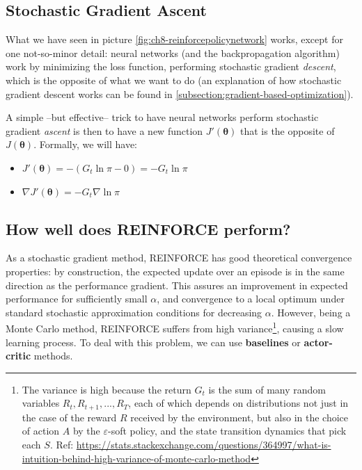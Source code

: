 \subsection{Stochastic Gradient Ascent}
What we have seen in picture \ref{fig:ch8-reinforcepolicynetwork} works, except for one not-so-minor detail: neural networks (and the backpropagation algorithm) work by minimizing the loss function, performing stochastic gradient \textit{descent}, which is the opposite of what we want to do (an explanation of how stochastic gradient descent works can be found in \autoref{subsection:gradient-based-optimization}).

A simple --but effective-- trick to have neural networks perform stochastic gradient \textit{ascent} is then to have a new function $J' (\boldsymbol{\theta})$ that is the opposite of $J(\boldsymbol{\theta})$. Formally, we will have:

\begin{itemize}
    \item $J' (\boldsymbol{\theta}) = -(G_t \ln{\pi} - 0) = -G_t \ln{\pi}$
    \item $\nabla J' (\boldsymbol{\theta}) = -G_t \nabla \ln{\pi}$
\end{itemize}

\subsection{How well does REINFORCE perform?}
As a stochastic gradient method, REINFORCE has good theoretical convergence properties: by construction, the expected update over an episode is in the same direction as the performance gradient. This assures an improvement in expected performance for sufficiently small $\alpha$, and convergence to a local optimum under standard stochastic approximation conditions for decreasing $\alpha$. However, being a Monte Carlo method, REINFORCE suffers from high variance\footnote{The variance is high because the return $G_t$ is the sum of many random variables $R_t, R_{t+1},...,R_T$, each of which depends on distributions not just in the case of the reward $R$ received by the environment, but also in the choice of action $A$ by the $\varepsilon$-soft policy, and the state transition dynamics that pick each $S$. Ref: \url{https://stats.stackexchange.com/questions/364997/what-is-intuition-behind-high-variance-of-monte-carlo-method}}, causing a slow learning process. To deal with this problem, we can use \textbf{baselines} or \textbf{actor-critic} methods.


